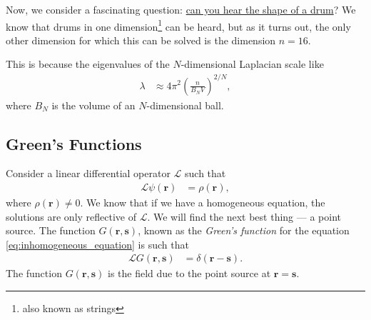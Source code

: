 \documentclass[10pt]{mypackage}
\begin{document}
  Now, we consider a fascinating question: \href{https://en.wikipedia.org/wiki/Hearing_the_shape_of_a_drum}{can you hear the shape of a drum}? We know that drums in one dimension\footnote{also known as strings} can be heard, but as it turns out, the only other dimension for which this can be solved is the dimension $n = 16$.\newline

  This is because the eigenvalues of the $N$-dimensional Laplacian scale like
  \begin{align*}
    \lambda &\approx 4\pi^2 \left( \frac{n}{B_N V} \right)^{2/N},
  \end{align*}
  where $B_N$ is the volume of an $N$-dimensional ball.
  \subsection{Green's Functions}%
  Consider a linear differential operator $\mathcal{L}$ such that
  \begin{align*}
    \mathcal{L}\psi\left( \mathbf{r} \right) &= \rho\left( \mathbf{r} \right),\label{eq:inhomogeneous_equation}\tag{$\ast$}
  \end{align*}
  where $\rho\left( \mathbf{r} \right) \neq 0$. We know that if we have a homogeneous equation, the solutions are only reflective of $\mathcal{L}$. We will find the next best thing --- a point source. The function $G\left( \mathbf{r},\mathbf{s} \right)$, known as the \textit{Green's function} for the equation \eqref{eq:inhomogeneous_equation} is such that
  \begin{align*}
    \mathcal{L}G\left( \mathbf{r},\mathbf{s} \right) &= \delta\left( \mathbf{r}-\mathbf{s} \right).
  \end{align*}
  The function $G\left( \mathbf{r},\mathbf{s} \right)$ is the field due to the point source at $\mathbf{r} = \mathbf{s}$.\newline
\end{document}
